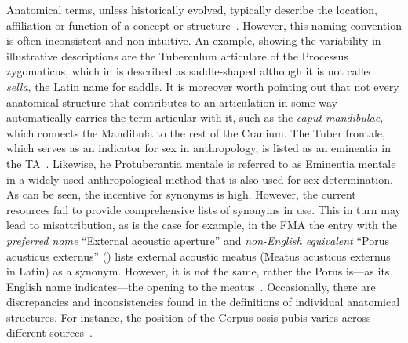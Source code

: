 \documentclass[sw]{iosart2x}
\begin{document}
Anatomical terms, unless historically evolved, typically describe the location, affiliation or function of a concept or structure~\citep{reforminganatomical}.
However, this naming convention is often inconsistent and non-intuitive.
An example, showing the variability in illustrative descriptions are the Tuberculum articulare of the Processus zygomaticus, which in \cite{anatomie} is described as saddle-shaped although it is not called \emph{sella}, the Latin name for saddle.
It is moreover worth pointing out that not every anatomical structure that contributes to an articulation in some way automatically carries the term articular with it, such as the \emph{caput mandibulae}, which connects the Mandibula to the rest of the Cranium.
The Tuber frontale, which serves as an indicator for sex in anthropology, is listed as an eminentia in the TA~\citep{ta2}.
Likewise, he Protuberantia mentale is referred to as Eminentia mentale in a widely-used anthropological method that is also used for sex determination.
As can be seen, the incentive for synonyms is high.
However, the current resources fail to provide comprehensive lists of synonyms in use.
This in turn may lead to misattribution, as is the case for example, in the FMA the entry with the \emph{preferred name} \enquote{External acoustic aperture} and \emph{non-English equivalent} \enquote{Porus acusticus externus} () lists external acoustic meatus (Meatus acusticus externus in Latin) as a synonym.
However, it is not the same, rather the Porus is---as its English name indicates---the opening to the meatus~\citep{anatomylexicon}.
Occasionally, there are discrepancies and inconsistencies found in the definitions of individual anatomical structures.
For instance, the position of the Corpus ossis pubis varies across different sources~\citep{anatomylexicon,prometheus,allgemeineanatomie,dualereiheanatomie,anatomiedesmenschen}.
\end{document}
